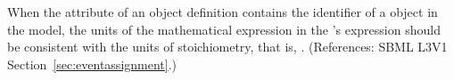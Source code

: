 When the  attribute of an \EventAssignment object
definition contains the identifier of a \SpeciesReference object in the
model, the units of the mathematical expression in the \EventAssignment's
 expression should be consistent with the units of
stoichiometry, that is, .  (References: SBML L3V1
Section~\ref{sec:eventassignment}.)
